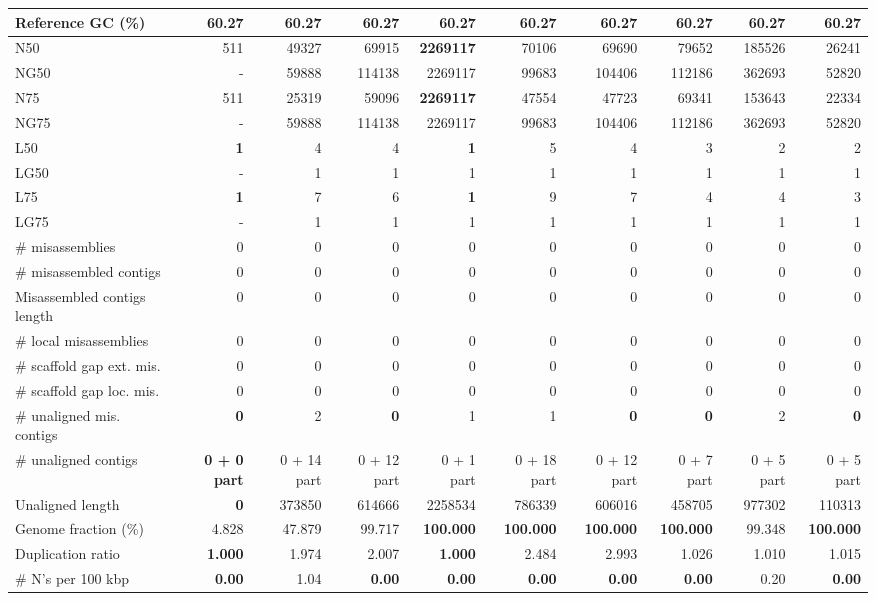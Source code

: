 \documentclass[12pt,a4paper]{article}
\begin{document}
\begin{table}[ht]
\begin{center}
\begin{tabular}{|l*{9}{|r}|}
Reference GC (\%) & 60.27 & 60.27 & 60.27 & 60.27 & 60.27 & 60.27 & 60.27 & 60.27 & 60.27 \\ \hline
N50 & 511 & 49327 & 69915 & {\bf 2269117} & 70106 & 69690 & 79652 & 185526 & 26241 \\ \hline
NG50 & - & 59888 & 114138 & 2269117 & 99683 & 104406 & 112186 & 362693 & 52820 \\ \hline
N75 & 511 & 25319 & 59096 & {\bf 2269117} & 47554 & 47723 & 69341 & 153643 & 22334 \\ \hline
NG75 & - & 59888 & 114138 & 2269117 & 99683 & 104406 & 112186 & 362693 & 52820 \\ \hline
L50 & {\bf 1} & 4 & 4 & {\bf 1} & 5 & 4 & 3 & 2 & 2 \\ \hline
LG50 & - & 1 & 1 & 1 & 1 & 1 & 1 & 1 & 1 \\ \hline
L75 & {\bf 1} & 7 & 6 & {\bf 1} & 9 & 7 & 4 & 4 & 3 \\ \hline
LG75 & - & 1 & 1 & 1 & 1 & 1 & 1 & 1 & 1 \\ \hline
\# misassemblies & 0 & 0 & 0 & 0 & 0 & 0 & 0 & 0 & 0 \\ \hline
\# misassembled contigs & 0 & 0 & 0 & 0 & 0 & 0 & 0 & 0 & 0 \\ \hline
Misassembled contigs length & 0 & 0 & 0 & 0 & 0 & 0 & 0 & 0 & 0 \\ \hline
\# local misassemblies & 0 & 0 & 0 & 0 & 0 & 0 & 0 & 0 & 0 \\ \hline
\# scaffold gap ext. mis. & 0 & 0 & 0 & 0 & 0 & 0 & 0 & 0 & 0 \\ \hline
\# scaffold gap loc. mis. & 0 & 0 & 0 & 0 & 0 & 0 & 0 & 0 & 0 \\ \hline
\# unaligned mis. contigs & {\bf 0} & 2 & {\bf 0} & 1 & 1 & {\bf 0} & {\bf 0} & 2 & {\bf 0} \\ \hline
\# unaligned contigs & {\bf 0 + 0 part} & 0 + 14 part & 0 + 12 part & 0 + 1 part & 0 + 18 part & 0 + 12 part & 0 + 7 part & 0 + 5 part & 0 + 5 part \\ \hline
Unaligned length & {\bf 0} & 373850 & 614666 & 2258534 & 786339 & 606016 & 458705 & 977302 & 110313 \\ \hline
Genome fraction (\%) & 4.828 & 47.879 & 99.717 & {\bf 100.000} & {\bf 100.000} & {\bf 100.000} & {\bf 100.000} & 99.348 & {\bf 100.000} \\ \hline
Duplication ratio & {\bf 1.000} & 1.974 & 2.007 & {\bf 1.000} & 2.484 & 2.993 & 1.026 & 1.010 & 1.015 \\ \hline
\# N's per 100 kbp & {\bf 0.00} & 1.04 & {\bf 0.00} & {\bf 0.00} & {\bf 0.00} & {\bf 0.00} & {\bf 0.00} & 0.20 & {\bf 0.00} \\ \hline

\end{tabular}
\end{center}
\end{table}
\end{document}

